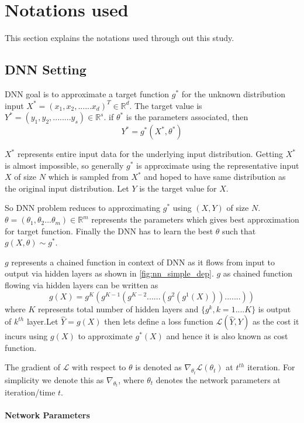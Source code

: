 \section{Notations used}
This section explains the notations used through out this study.
\subsection{DNN Setting}
DNN goal is to approximate a target function $g^*$ for the unknown distribution input $X^*=(x_1,x_2,......x_d)^T \in \mathbb{R}^d$. The target value is $Y^*=(y_1,y_2,........y_s) \in \mathbb{R}^s$. if $\theta^*$ is the parameters associated, then 
\begin{equation}
Y^*=g^*(X^*, \theta^*)
\end{equation}								

$X^*$ represents entire input data for the underlying input distribution. 
Getting $X^*$ is almost impossible, so generally $g^*$ is approximate using the representative input $X$ of size $N$ which is sampled from $X^*$ and hoped to have same distribution as the original input distribution. Let $Y$ is the target value for $X$.

So DNN problem reduces to approximating $ g^*$ using $(X,Y)$ of size $N$. $\theta=(\theta_1,\theta_2...\theta_m) \in \mathbb{R}^m$ represents the parameters which gives best approximation for target function. Finally the DNN has to learn the best $\theta$  such that $g(X,\theta) \sim g^*$. 

$g$ represents a chained function in context of DNN as it flows from input to output via hidden layers as shown in \ref{fig:nn_simple_dep}. $g$ as chained function flowing via hidden layers can  be written as
\begin{equation}
g(X)=g^K(g^{K-1}(g^{K-2}......(g^2(g^1(X))).......)) 
\end{equation}
where $K$ represents total number of hidden layers and $\{g^k, k=1....K\}$ is output of $k^{th}$ layer.Let $\hat{Y}=g(X)$ then lets define a loss function $\mathcal{L}(\hat{Y},Y)$ as the cost it incurs using $g(X)$ to approximate $g^*(X)$ and hence it is also known as cost function.

The gradient of $\mathcal{L}$ with respect to $\theta$ is denoted as $\nabla_{\theta_{t}}\mathcal{L}(\theta_{t})$ at $t^{th}$ iteration. For simplicity we denote this as $\nabla_{\theta_{t}}$, where $\theta_{t}$ denotes the network parameters at iteration/time $t$.

\paragraph{Network Parameters}
%
%
%
%


